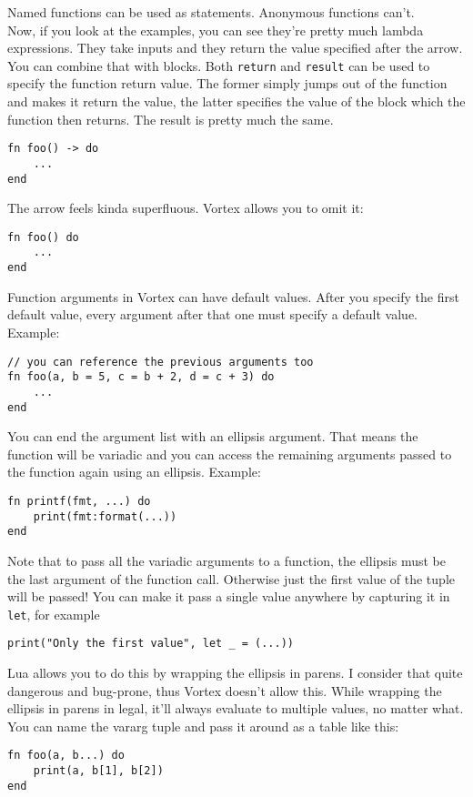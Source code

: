 \documentclass{article}
\begin{document}
Named functions can be used as statements. Anonymous functions can't.\\
Now, if you look at the examples, you can see they're pretty much lambda
expressions. They take inputs and they return the value specified after
the arrow. You can combine that with blocks. Both \verb|return| and
\verb|result| can be used to specify the function return value. The
former simply jumps out of the function and makes it return the value,
the latter specifies the value of the block which the function then
returns. The result is pretty much the same.
\begin{lstlisting}[language=vortex]
fn foo() -> do
    ...
end
\end{lstlisting}
The arrow feels kinda superfluous. Vortex allows you to omit it:
\begin{lstlisting}[language=vortex]
fn foo() do
    ...
end
\end{lstlisting}
Function arguments in Vortex can have default values. After you specify
the first default value, every argument after that one must specify a default
value. Example:
\begin{lstlisting}[language=vortex]
// you can reference the previous arguments too
fn foo(a, b = 5, c = b + 2, d = c + 3) do
    ...
end
\end{lstlisting}
You can end the argument list with an ellipsis argument. That means the
function will be variadic and you can access the remaining arguments
passed to the function again using an ellipsis. Example:
\begin{lstlisting}[language=vortex]
fn printf(fmt, ...) do
    print(fmt:format(...))
end
\end{lstlisting}
Note that to pass all the variadic arguments to a function, the ellipsis
must be the last argument of the function call. Otherwise just the first
value of the tuple will be passed! You can make it pass a single value
anywhere by capturing it in \verb|let|, for example
\begin{lstlisting}[language=vortex]
print("Only the first value", let _ = (...))
\end{lstlisting}
Lua allows you to do this by wrapping the ellipsis in parens. I consider
that quite dangerous and bug-prone, thus Vortex doesn't allow this. While
wrapping the ellipsis in parens in legal, it'll always evaluate to multiple
values, no matter what.\\
You can name the vararg tuple and pass it around as a table like this:
\begin{lstlisting}[language=vortex]
fn foo(a, b...) do
    print(a, b[1], b[2])
end
\end{lstlisting}
\end{document}
